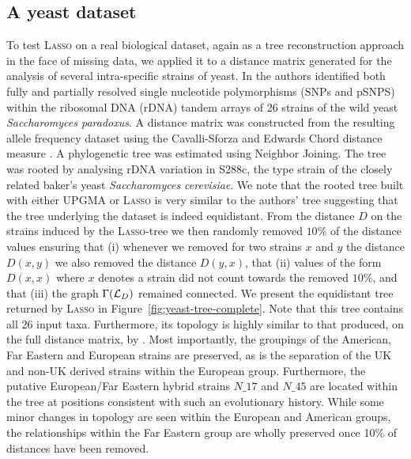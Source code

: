 \subsection{A yeast dataset}
\label{sec:yeast-dataset}

To test \textsc{Lasso} on a real biological dataset, again as a tree
reconstruction approach in the face of missing data, we applied it to a
distance matrix generated for the analysis of several intra-specific strains
of yeast.  In \cite{west14ribosomal} the authors identified both fully and
partially resolved single nucleotide polymorphisms (SNPs and pSNPS) within the
ribosomal DNA (rDNA) tandem arrays of 26 strains of the wild yeast
\textit{Saccharomyces paradoxus}.  A distance matrix was constructed from the
resulting allele frequency dataset using the Cavalli-Sforza and Edwards Chord
distance measure \cite{cavalli}.  A phylogenetic tree was estimated using
Neighbor Joining.  The tree was rooted by analysing rDNA variation in S288c,
the type strain of the closely related baker's yeast \textit{Saccharomyces
  cerevisiae}.  We note that the rooted tree built with either \textsc{UPGMA}
or \textsc{Lasso} is very similar to the authors' tree suggesting that the
tree underlying the dataset is indeed equidistant. From the distance $D$ on
the strains induced by the \textsc{Lasso}-tree we then randomly removed $10\%$
of the distance values ensuring that (i) whenever we removed for two strains
$x$ and $y$ the distance $D(x,y)$ we also removed the distance $D(y,x)$, that
(ii) values of the form $D(x,x)$ where $x$ denotes a strain did not count
towards the removed $10\%$, and that (iii) the graph $\Gamma({\mathcal L}_D)$ remained
connected. We present the equidistant tree returned by \textsc{Lasso} in
Figure~\ref{fig:yeast-tree-complete}.  Note that this tree contains all 26
input taxa. Furthermore, its topology is highly similar to that produced, on
the full distance matrix, by \cite{west14ribosomal}. Most importantly, the
groupings of the American, Far Eastern and European strains are preserved, as
is the separation of the UK and non-UK derived strains within the European
group. Furthermore, the putative European/Far Eastern hybrid strains $N\_17$
and $N\_45$ are located within the tree at positions consistent with such an
evolutionary history. While some minor changes in topology are seen within the
European and American groups, the relationships within the Far Eastern group
are wholly preserved once 10\% of distances have been removed.

